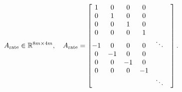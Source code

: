 \begin{equation*}
  A_\text{rate} \in \mathbb{R}^{8m\times 4m}, \quad
  A_\text{rate} = 
  \begin{bmatrix}
    1 & 0 & 0 & 0 &  & \\
    0 & 1 & 0 & 0 &  & \\
    0 & 0 & 1 & 0 &  & \\
    0 & 0 & 0 & 1 &  & \\
    -1& 0 & 0 & 0 & \ddots  & \\
    0 & -1& 0 & 0 &  & \\
    0 & 0 &-1 & 0 &  & \\
    0 & 0 & 0 &-1 &  & \\
    &  &  &  & \ddots  & \\
  \end{bmatrix}.
\end{equation*}




